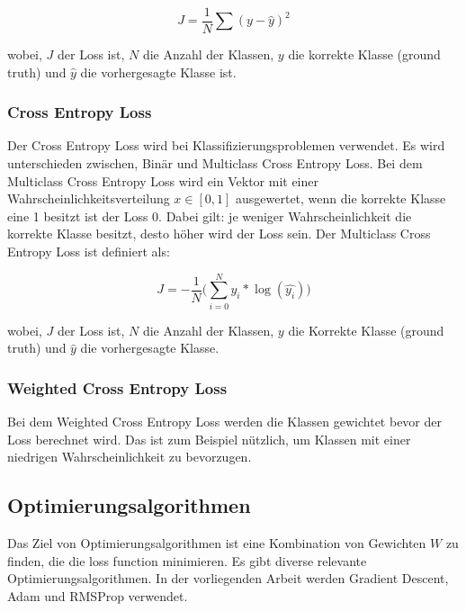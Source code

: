 \begin{equation}
  J = \frac{1}{N} \sum (y - \hat{y})^2
\end{equation}

wobei, $J$ der Loss ist, $N$ die Anzahl der Klassen, $y$ die korrekte Klasse (\gls{ground truth}) und $ \hat{y}$ die vorhergesagte Klasse ist.

\subsubsection{Cross Entropy Loss}
Der Cross Entropy Loss wird bei Klassifizierungsproblemen verwendet. Es wird unterschieden zwischen, Binär und Multiclass Cross Entropy Loss.
Bei dem Multiclass Cross Entropy Loss wird ein Vektor mit einer Wahrscheinlichkeitsverteilung $ x \in [0, 1] $
ausgewertet, wenn die korrekte Klasse eine 1 besitzt ist der Loss 0. Dabei gilt: je weniger Wahrscheinlichkeit die korrekte Klasse besitzt,
desto höher wird der Loss sein. Der Multiclass Cross Entropy Loss ist definiert als:

\begin{equation}
  J = -\frac{1}{N} \Big(\sum_{i=0}^N y_{i} * \log(\hat{y_{i}})\Big)
\end{equation}

wobei, $J$ der Loss ist, $N$ die Anzahl der Klassen, $y$ die Korrekte Klasse (\gls{ground truth}) und $ \hat{y}$ die vorhergesagte Klasse.

\subsubsection{Weighted Cross Entropy Loss}
Bei dem Weighted Cross Entropy Loss werden die Klassen gewichtet bevor der Loss berechnet wird. Das ist zum Beispiel nützlich, um Klassen
mit einer niedrigen Wahrscheinlichkeit zu bevorzugen.

\subsection{Optimierungsalgorithmen}
Das Ziel von Optimierungsalgorithmen ist eine Kombination von Gewichten $ W $ zu finden, die die \gls{loss function} minimieren.
Es gibt diverse relevante Optimierungsalgorithmen. In der vorliegenden Arbeit werden Gradient Descent, Adam und RMSProp verwendet.

